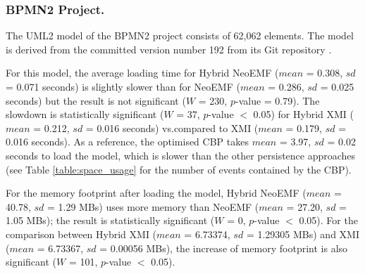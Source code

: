 \documentclass{llncs}
\begin{document}
\subsubsection{BPMN2 Project.}
\label{sec:model_loading_time_bpmn2}
The UML2 model of the BPMN2 project consists of 62,062 elements. The model is derived from the committed version number 192 from its Git repository \cite{eclipse2018bpmn2git}. 

For this model, the average loading time for Hybrid NeoEMF ($mean$ = 0.308, $sd$ = 0.071 seconds) is slightly slower than for NeoEMF ($mean$ = 0.286, $sd$ = 0.025 seconds) but the result is not significant ($W$ = 230, $p$-value = 0.79). The slowdown is statistically significant ($W$ = 37, $p$-value $<$ 0.05) for Hybrid XMI ($mean$ = 0.212, $sd$ = 0.016 seconds) vs.compared to XMI ($mean$ = 0.179, $sd$ = 0.016 seconds). As a reference, the optimised CBP \cite{yohannis2018towards} takes $mean$ = 3.97, $sd$ = 0.02 seconds to load the model, which is slower than the other persistence approaches (see Table \ref{table:space_usage} for the number of events contained by the CBP). 

For the memory footprint after loading the model, Hybrid NeoEMF ($mean$ = 40.78, $sd$ = 1.29 MBs) uses more memory than NeoEMF ($mean$ = 27.20, $sd$ = 1.05 MBs); the result is statistically significant ($W$ = 0, $p$-value $<$ 0.05). For the comparison between Hybrid XMI ($mean$ = 6.73374, $sd$ = 1.29305 MBs) and XMI ($mean$ = 6.73367, $sd$ = 0.00056 MBs), the increase of memory footprint is also significant ($W$ = 101, $p$-value $<$ 0.05). 
\end{document}
